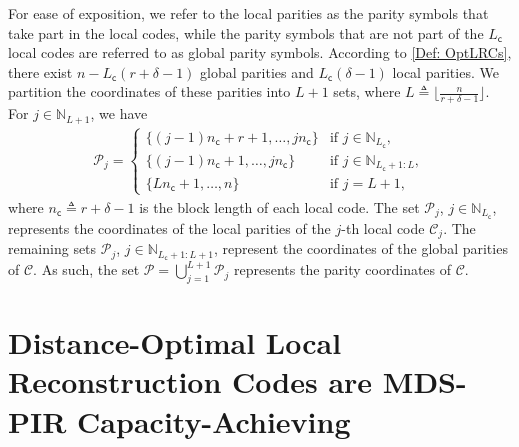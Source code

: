\documentclass[twocolumn,conference]{IEEEtran}
\newcommand{\eqdef}{\triangleq}              %
\newcommand{\set}[1]{\mathcal{#1}}           %
\newcommand{\mat}[1]{\bm{#1}}                %
\newcommand{\Nat}[1]{\mathbb{N}_{#1}}        %
\newcommand{\code}[1]{\mathcal{#1}}          %
\begin{document}
For ease of exposition, we refer to the local parities as the parity symbols that take part in the local codes, while the parity symbols that are not part of the $L_{\mathsf c}$ local codes are referred to as global parity symbols. According to \cref{Def: OptLRCs}, there exist $n-L_{\mathsf{c}}(r+\delta-1)$ global parities and $L_{\mathsf{c}}(\delta-1)$ local parities. We partition the coordinates of these parities into $L+1$ sets, where $L\eqdef\bigl\lfloor \frac{n}{r+\delta-1}\bigr\rfloor$. For $j\in\Nat{L+1}$, we have
\begin{align}
  \mathcal P_j
  =\begin{cases}
    \{(j-1)n_\mathsf{c}+r+1,\ldots,j n_\mathsf{c}\} & \text{if }j\in\Nat{L_{\mathsf c}},\\
    \{(j-1)n_\mathsf{c}+1,\ldots,j n_\mathsf{c}\} & \text{if }j\in\Nat{L_{\mathsf c}+1: L},\\
    \{L n_\mathsf{c}+1,\ldots,n\} & \text{if } j=L+1,
  \end{cases}\label{eq:parities_LRC}
\end{align} 
where $n_\mathsf{c}\eqdef r+\delta-1$ is the block length of each local code. The set $\mathcal P_{j}$, $j\in\Nat{L_{\mathsf c}}$, represents the coordinates of the local parities of the $j$-th local code $\mathcal C_{j}$. The remaining sets $\mathcal P_{j}$, $j\in\Nat{L_{\mathsf c}+1:L+1}$, represent the coordinates of the global parities of $\mathcal C$. As such, the set $\set{P}=\bigcup_{j=1}^{L+1} \mathcal P_j$ represents the parity coordinates of $\mathcal C$.

 
\section{Distance-Optimal Local Reconstruction Codes are MDS-PIR Capacity-Achieving}
\label{Sec: Ematrix_LRC}
\end{document}
